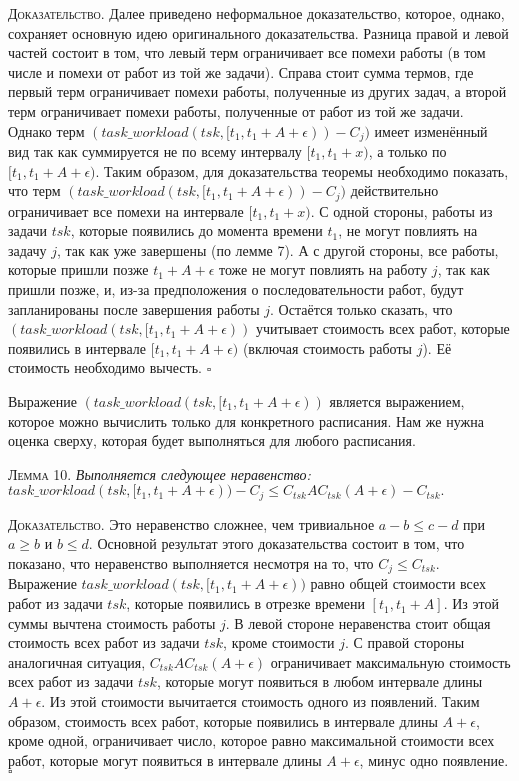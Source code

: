 \documentclass[14pt]{matmex-diploma-custom}
\begin{document}
\textsc{Доказательство.}
  Далее приведено неформальное доказательство, которое, однако, сохраняет основную идею 
  оригинального доказательства. Разница правой и левой частей состоит в том, что 
  левый терм ограничивает все помехи работы (в том числе и помехи от работ из той же задачи).
  Справа стоит сумма термов, где 
    первый терм ограничивает помехи работы, полученные из других задач, 
    а второй терм ограничивает помехи работы, полученные от работ из той же задачи.
  Однако терм $(task\_workload(tsk, [t_1, t_1 + A + \epsilon)) - C_{j})$ 
    имеет изменённый вид так как суммируется не по всему интервалу $[t_1, t_1 + x)$, 
    а только по $[t_1, t_1 + A + \epsilon)$.
  Таким образом, для доказательства теоремы необходимо показать, 
    что терм $(task\_workload(tsk, [t_1, t_1 + A + \epsilon)) - C_{j})$ 
    действительно ограничивает все помехи на интервале $[t_1, t_1 + x)$. 
  С одной стороны, работы из задачи $tsk$, которые появились до момента времени $t_1$, 
    не могут повлиять на задачу $j$, так как уже завершены (по лемме 7).
  А с другой стороны, все работы, которые пришли позже $t_1 + A + \epsilon$ тоже 
    не могут повлиять на работу $j$, так как пришли позже, и, из-за предположения 
    о последовательности работ, будут запланированы после завершения работы $j$.
  Остаётся только сказать, что $(task\_workload(tsk, [t_1, t_1 + A + \epsilon))$ 
    учитывает стоимость всех работ, которые появились в интервале $[t_1, t_1 + A + \epsilon)$ 
    (включая стоимость работы $j$). Её стоимость необходимо вычесть. $\square$

Выражение $(task\_workload(tsk, [t_1, t_1 + A + \epsilon))$ является выражением, 
  которое можно вычислить только для конкретного расписания. Нам же нужна оценка сверху, 
  которая будет выполняться для любого расписания.

\textsc{Лемма 10.}
\textit{Выполняется следующее неравенство: \\ 
$task\_workload(tsk, [t_1, t_1 + A + \epsilon)) - C_{j} \leq C_{tsk}AC_{tsk}(A + \epsilon) - C_{tsk}.$
}

\textsc{Доказательство.} Это неравенство сложнее, чем тривиальное $a - b \leq c - d$ при $ a \geq b$ и $b \leq d$. 
  Основной результат этого доказательства состоит в том, что показано, 
  что неравенство выполняется несмотря на то, что $C_{j} \leq C_{tsk}$. 
  Выражение $task\_workload(tsk, [t_1, t_1 + A + \epsilon))$ равно 
    общей стоимости всех работ из задачи $tsk$, которые появились в 
    отрезке времени $[t_1, t_1 + A]$. Из этой суммы вычтена стоимость работы $j$. 
  В левой стороне неравенства стоит общая стоимость всех работ из задачи $tsk$, кроме стоимости $j$. 
  С правой стороны аналогичная ситуация, $C_{tsk}AC_{tsk}(A + \epsilon)$ ограничивает 
    максимальную стоимость всех работ из задачи $tsk$, которые могут появиться 
    в любом интервале длины $A + \epsilon$. Из этой стоимости вычитается стоимость 
    одного из появлений. Таким образом, стоимость всех работ, которые появились 
    в интервале длины $A + \epsilon$, кроме одной, 
   ограничивает число, которое равно максимальной стоимости всех работ, 
    которые могут появиться в интервале длины $A + \epsilon$, минус одно появление. $\square$
\end{document}
